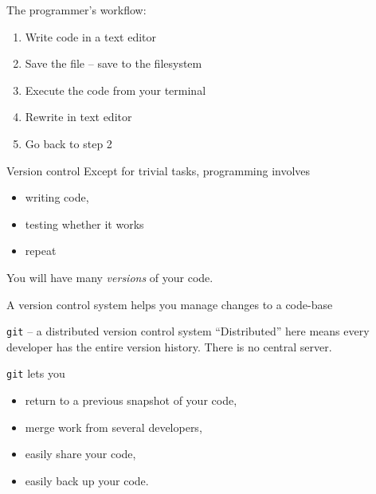 \documentclass[xcolor=dvipsnames,compress,12pt]{beamer}
\begin{document}
\begin{frame}{The programmer's workflow:}
\Large
\begin{enumerate}
    \item Write code in a text editor
    \item Save the file -- save to the filesystem
    \item Execute the code from your terminal
    \item Rewrite in text editor
    \item Go back to step 2
\end{enumerate}
\end{frame}


\begin{frame}{Version control}
\Large
Except for trivial tasks, programming involves
\begin{itemize}
    \item writing code,
    \item testing whether it works
    \item repeat
\end{itemize}

You will have many {\em versions} of your code.

A version control system helps you manage changes to a code-base
\end{frame}

\begin{frame}{{\tt git} -- a distributed version control system}
``Distributed'' here means every developer has the entire version history. There is no central server.

{\tt git} lets you
\begin{itemize}
    \item return to a previous snapshot of your code,
    \item merge work from several developers,
    \item easily share your code,
    \item easily back up your code.
\end{itemize}
\end{frame}
\end{document}
